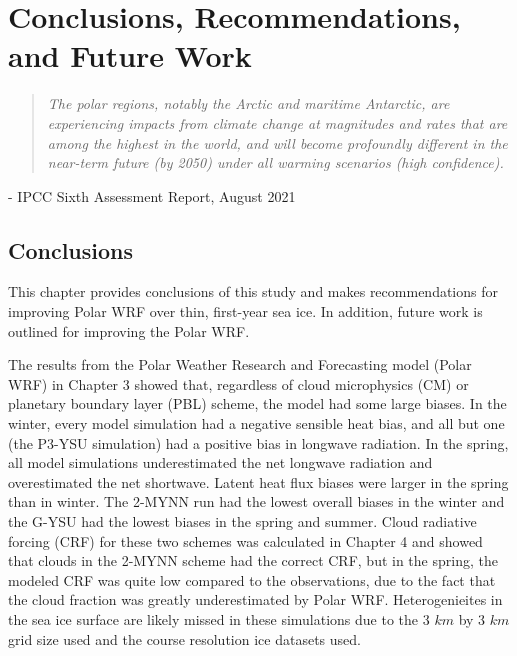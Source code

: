 \chapter{Conclusions, Recommendations, and Future Work}
\vspace{1 cm}
\begin{spacing}{1} \begin{quote} 
\noindent \emph{The polar regions, notably the Arctic and maritime Antarctic, are experiencing impacts from climate change at magnitudes and rates that are among the highest in the world, and will become profoundly different in the near-term future (by 2050) under all warming scenarios (high confidence).}\end{quote}
\hspace{6 cm} - IPCC Sixth Assessment Report, August 2021  
\end{spacing}
\doublespacing
\section{Conclusions}

This chapter provides conclusions of this study and makes recommendations for improving Polar WRF over thin, first-year sea ice. In addition, future work is outlined for improving the Polar WRF. 

The results from the Polar Weather Research and Forecasting model (Polar WRF) in Chapter 3 showed that, regardless of cloud microphysics (CM) or planetary boundary layer (PBL) scheme, the model had some large biases. In the winter, every model simulation had a negative sensible heat bias, and all but one (the P3-YSU simulation) had a positive bias in longwave radiation. In the spring, all model simulations underestimated the net longwave radiation and overestimated the net shortwave. Latent heat flux biases were larger in the spring than in winter. The 2-MYNN run had the lowest overall biases in the winter and the G-YSU had the lowest biases in the spring and summer. Cloud radiative forcing (CRF) for these two schemes was calculated in Chapter 4 and showed that clouds in the 2-MYNN scheme had the correct CRF, but in the spring, the modeled CRF was quite low compared to the observations, due to the fact that the cloud fraction was greatly underestimated by Polar WRF. Heterogenieites in the sea ice surface are likely missed in these simulations due to the 3 $km$ by 3 $km$
 grid size used and the course resolution ice datasets used.
 
